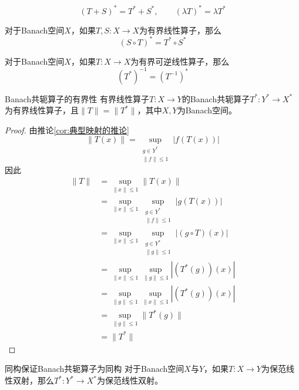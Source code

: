 \documentclass[lang = cn, scheme = chinese, thmcnt = section]{elegantbook}
\begin{document}
\begin{proposition}
	$$
	(T+S)^*=T^*+S^*,\qquad 
	(\lambda T)^*=\lambda T^*
	$$
\end{proposition}

\begin{proposition}
	对于Banach空间$X$，如果$T,S:X\to X$为有界线性算子，那么
	$$
	(S\circ T)^*=T^*\circ S^*
	$$
\end{proposition}

\begin{proposition}
	对于Banach空间$X$，如果$T:X\to X$为有界可逆线性算子，那么
	$$
	(T^*)^{-1}=(T^{-1})^*
	$$
\end{proposition}

\begin{theorem}{}{Banach共轭算子的有界性}
	有界线性算子$T:X\to Y$的Banach共轭算子$T^*:Y^*\to X^*$为有界线性算子，且$\|T\|=\|T^*\|$，其中$X,Y$为Banach空间。
\end{theorem}

\begin{proof}
	由推论\ref{cor:典型映射的推论}
	$$
	\|T(x)\|=\sup_{\substack{g\in Y^*\\\|f\|\le 1}}|f(T(x))|
	$$
	因此
	\begin{align*}
		\|T\|
		& = \sup_{\|x\|\le1 }\|T(x)\|\\
		& = \sup_{\|x\|\le1 }\sup_{\substack{g\in Y^*\\\|f\|\le 1}}|g(T(x))|\\
		& = \sup_{\|x\|\le1 }\sup_{\substack{g\in Y^*\\\|g\|\le 1}}|(g\circ T)(x)|\\
		& = \sup_{\|x\|\le1 }\sup_{\|g\|\le 1}|(T^*(g))(x)|\\
		& = \sup_{\|g\|\le 1}\sup_{\|x\|\le1 }|(T^*(g))(x)|\\
		& = \sup_{\|g\|\le 1}\|T^*(g)\|\\
		& = \|T^*\|
	\end{align*}
\end{proof}

\begin{theorem}{}{同构保证Banach共轭算子为同构}
	对于Banach空间$X$与$Y$，如果$T:X\to Y$为保范线性双射，那么$T^*:Y^*\to X^*$为保范线性双射。
\end{theorem}
\end{document}
